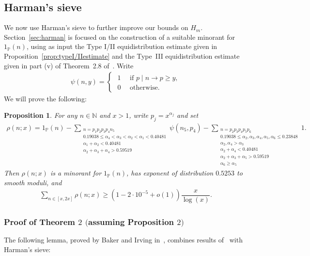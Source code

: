 \documentclass{amsart}
\newtheorem{prop}{Proposition}
\numberwithin{equation}{section}
\begin{document}
\subsection{Harman's sieve} 
We now use Harman's sieve to further improve our bounds on $H_m$. 
Section~\ref{sec:harman} is focused on the construction of a suitable minorant for $1_{\mathbb{P}}(n)$, using as input the Type I/II equidistribution estimate given in  Proposition~\ref{prop:typeI/IIestimate} and the Type~III equidistribution estimate given in part (v) of Theorem~2.8 of~\cite{Polymath:2014:EDZ}. Write 
\begin{align*}
\psi(n,y) = \begin{cases} 
\,\, 1  \quad \mbox{ if } p \mid n \rightarrow p \geq y, \\ \,\, 0 \quad \mbox{ otherwise. }
\end{cases}
\end{align*}
We will prove the following: 

\begin{prop} \label{prop:construction}
For any  $n \in \mathbb{N}$ and $x>1$, write $p_j = x^{\alpha_j}$ and set
\begin{align*}
\rho(n;x) = 1_{\mathbb{P}}(n) - \sum_{\substack{ n = p_1p_2p_3p_4n_5 \\ 0.19038\leq \alpha_4 < \alpha_3 < \alpha_2 < \alpha_1 < 0.40481 \\ \alpha_1+\alpha_2 < 0.40481 \\ \alpha_2+\alpha_3+\alpha_4 >0.59519}} \psi(n_5, p_4)- \sum_{\substack{ n = p_2p_3p_4p_5p_6 \\ 0.19038 \leq \alpha_2, \alpha_3, \alpha_4, \alpha_5, \alpha_6 \leq 0.23848  \\ \alpha_2, \alpha_4 > \alpha_3  \\ \alpha_2+\alpha_4 < 0.40481\\ \alpha_2 + \alpha_3 + \alpha_5 >0.59519 \\   \alpha_6 \geq \alpha_5 }} 1.
\end{align*}
Then $\rho(n;x)$ is a minorant for $1_{\mathbb{P}}(n)$, has exponent of distribution $0.5253 $ to smooth moduli, and
\begin{align*}
\sum_{n \in [x,2x]} \rho(n;x) \geq (1- 2 \cdot 10^{-5} +o(1)) \dfrac{x}{\log(x)}.
\end{align*}
\end{prop}

\subsubsection{Proof of Theorem $2$ $($assuming Proposition $2)$} The following lemma, proved by Baker and Irving in~\cite{Baker:2017:BIP}, combines results of~\cite{Polymath:2014:VSS} with Harman's sieve: 
\end{document}
